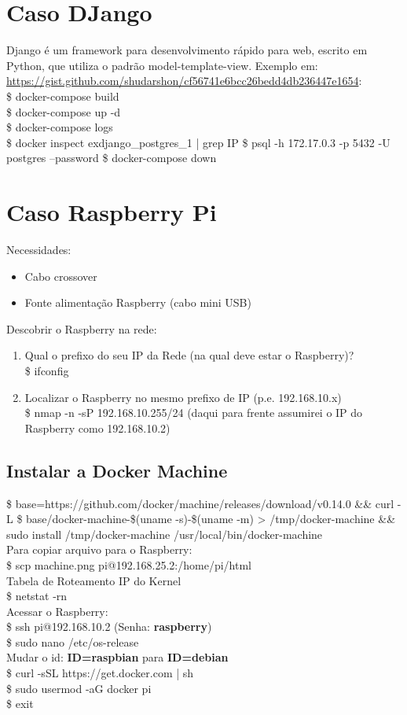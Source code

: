 \documentclass[a4paper,11pt]{article}
\begin{document}
\section{Caso DJango}
Django é um framework para desenvolvimento rápido para web, escrito em Python, que utiliza o padrão model-template-view. Exemplo em: \url{https://gist.github.com/shudarshon/cf56741e6bcc26bedd4db236447e1654}: \\
{\ttfamily\$ docker-compose build} \\
{\ttfamily\$ docker-compose up -d} \\
{\ttfamily\$ docker-compose logs} \\
{\ttfamily\$ docker inspect exdjango\_postgres\_1 | grep IP}
{\ttfamily\$ psql -h 172.17.0.3 -p 5432 -U postgres --password}
{\ttfamily\$ docker-compose down}

\section{Caso Raspberry Pi}
Necessidades:
\begin{itemize}[noitemsep]
	\item Cabo crossover
	\item Fonte alimentação Raspberry (cabo mini USB)
\end{itemize}
Descobrir o Raspberry na rede:
\begin{enumerate}
	\item Qual o prefixo do seu IP da Rede (na qual deve estar o Raspberry)? \\ {\ttfamily\$ ifconfig}
	\item Localizar o Raspberry no mesmo prefixo de IP (p.e. 192.168.10.x) \\ {\ttfamily\$ nmap -n -sP 192.168.10.255/24} (daqui para frente assumirei o IP do Raspberry como 192.168.10.2)
\end{enumerate}

\subsection{Instalar a Docker Machine}
{\ttfamily\$ base=https://github.com/docker/machine/releases/download/v0.14.0 \&\&
curl -L \$ base/docker-machine-\$(uname -s)-\$(uname -m) > /tmp/docker-machine \&\& sudo install /tmp/docker-machine /usr/local/bin/docker-machine} \\[2mm]
Para copiar arquivo para o Raspberry: \\
{\ttfamily\$ scp machine.png pi@192.168.25.2:/home/pi/html} \\[2mm]
Tabela de Roteamento IP do Kernel \\
{\ttfamily\$ netstat -rn} \\[2mm]
Acessar o Raspberry: \\
{\ttfamily\$ ssh pi@192.168.10.2} (Senha: \textbf{raspberry}) \\
{\ttfamily\$ sudo nano /etc/os-release} \\
Mudar o id: \textbf{ID=raspbian} para \textbf{ID=debian} \\
{\ttfamily\$ curl -sSL https://get.docker.com | sh} \\
{\ttfamily\$ sudo usermod -aG docker pi} \\
{\ttfamily\$ exit}
\end{document}

